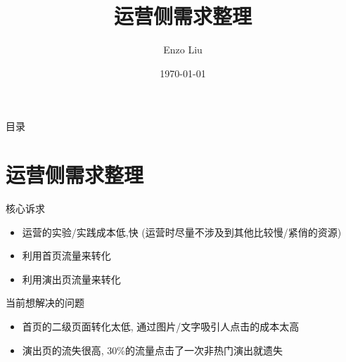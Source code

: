 \documentclass[presentation,bigger]{beamer}
\author{Enzo Liu}
\date{\today}
\title{运营侧需求整理}
\begin{document}
\maketitle
\begin{frame}{目录}
\tableofcontents
\end{frame}


\section{运营侧需求整理}
\label{sec:orgheadline5}
\begin{frame}[label={sec:orgheadline1}]{核心诉求}
\begin{itemize}
\item 运营的实验/实践成本低,快 (运营时尽量不涉及到其他比较慢/紧俏的资源)
\item 利用首页流量来转化
\item 利用演出页流量来转化
\end{itemize}
\end{frame}

\begin{frame}[label={sec:orgheadline2}]{当前想解决的问题}
\begin{itemize}
\item 首页的二级页面转化太低, 通过图片/文字吸引人点击的成本太高
\item 演出页的流失很高, 30\%的流量点击了一次非热门演出就遗失
\end{itemize}
\end{frame}
\end{document}
